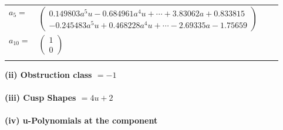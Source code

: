 \documentclass[1p]{elsarticle_modified}
\theoremstyle{definition}
\begin{document}
\begin{tabular}{m{7pt} m{180pt} m{7pt} m{180pt} }
\flushright $a_{5}=$&$\begin{pmatrix}0.149803 a^{5} u-0.684961 a^{4} u+\cdots+3.83062 a+0.833815\\-0.245483 a^{5} u+0.468228 a^{4} u+\cdots-2.69335 a-1.75659\end{pmatrix}$ \\
\flushright $a_{10}=$&$\begin{pmatrix}1\\0\end{pmatrix}$\\&\end{tabular}
\flushleft \textbf{(ii) Obstruction class $= -1$}\\~\\
\flushleft \textbf{(iii) Cusp Shapes $= 4 u+2$}\\~\\
\newpage\renewcommand{\arraystretch}{1}
\flushleft \textbf{(iv) u-Polynomials at the component}\newline \\
\end{document}
